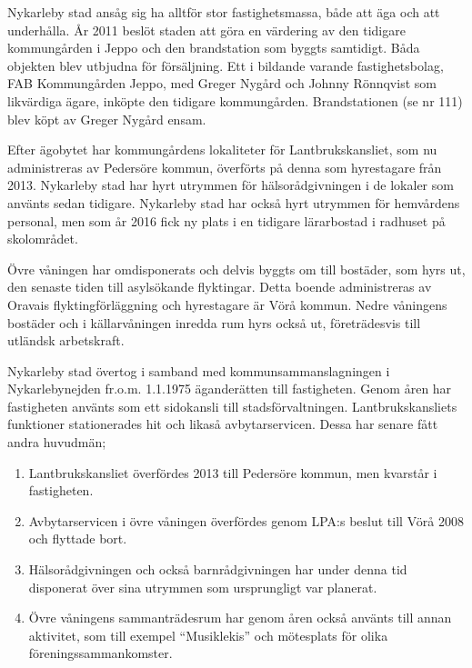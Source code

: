 
Nykarleby stad ansåg sig ha alltför stor fastighetsmassa, både att äga och att underhålla. År 2011 beslöt staden att göra en värdering av den tidigare kommungården i Jeppo och den brandstation som  byggts samtidigt. Båda objekten blev utbjudna för försäljning. Ett i bildande varande fastighetsbolag, FAB Kommungården Jeppo, med Greger Nygård och Johnny Rönnqvist som likvärdiga ägare, inköpte den tidigare kommungården. Brandstationen (se nr 111) blev köpt av Greger Nygård ensam.


Efter ägobytet har kommungårdens lokaliteter för Lantbrukskansliet, som nu administreras av Pedersöre kommun, överförts på denna som hyrestagare från 2013. Nykarleby stad har  hyrt utrymmen för hälsorådgivningen i de lokaler som använts sedan tidigare. Nykarleby stad har också hyrt utrymmen för hemvårdens personal, men som år 2016 fick ny plats i en tidigare lärarbostad i radhuset på skolområdet.

Övre våningen har omdisponerats och delvis byggts om till bostäder, som hyrs ut, den senaste tiden till asylsökande flyktingar. Detta boende
administreras av Oravais flyktingförläggning och hyrestagare är Vörå kommun. Nedre våningens bostäder och i källarvåningen inredda rum hyrs också ut, företrädesvis till utländsk arbetskraft.


Nykarleby stad övertog i samband med kommunsammanslagningen i Nykarlebynejden fr.o.m. 1.1.1975 äganderätten till fastigheten. Genom åren har fastigheten använts som ett sidokansli till stadsförvaltningen. Lantbrukskansliets funktioner stationerades hit och likaså avbytarservicen. Dessa har senare fått andra huvudmän;
\begin{enumerate}
  \item Lantbrukskansliet överfördes 2013 till Pedersöre kommun, men kvarstår i fastigheten.
  \item Avbytarservicen i övre  våningen överfördes genom LPA:s beslut till Vörå 2008 och flyttade bort.
  \item Hälsorådgivningen och också barnrådgivningen har under denna tid disponerat över sina utrymmen som ursprungligt var planerat.
  \item Övre våningens sammanträdesrum har genom åren också använts till annan aktivitet, som till exempel ``Musiklekis'' och mötesplats för olika föreningssammankomster.
\end{enumerate}


